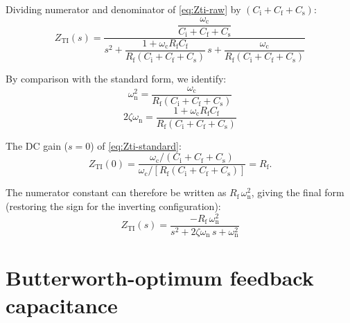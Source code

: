 \documentclass[a4paper,11pt]{article}
\begin{document}
Dividing numerator and denominator of \eqref{eq:Zti-raw} by
$(C_{\mathrm{i}} + C_{\mathrm{f}} + C_{\mathrm{s}})$:
\begin{equation}
  Z_{\mathrm{TI}}(s)
  = \frac{\dfrac{\omega_{\mathrm{c}}}
              {C_{\mathrm{i}} + C_{\mathrm{f}} + C_{\mathrm{s}}}}
         {s^2
          + \dfrac{1 + \omega_{\mathrm{c}}R_{\mathrm{f}}C_{\mathrm{f}}}
                  {R_{\mathrm{f}}
                   (C_{\mathrm{i}} + C_{\mathrm{f}} + C_{\mathrm{s}})}\,s
          + \dfrac{\omega_{\mathrm{c}}}
                  {R_{\mathrm{f}}
                   (C_{\mathrm{i}} + C_{\mathrm{f}} + C_{\mathrm{s}})}}
  \label{eq:Zti-standard}
\end{equation}

By comparison with the standard form, we identify:
\begin{equation}
  \omega_{\mathrm{n}}^2
  = \frac{\omega_{\mathrm{c}}}
         {R_{\mathrm{f}}(C_{\mathrm{i}} + C_{\mathrm{f}}
          + C_{\mathrm{s}})}
  \label{eq:omega-n}
\end{equation}
\begin{equation}
  2\zeta\omega_{\mathrm{n}}
  = \frac{1 + \omega_{\mathrm{c}} R_{\mathrm{f}} C_{\mathrm{f}}}
         {R_{\mathrm{f}}(C_{\mathrm{i}} + C_{\mathrm{f}}
          + C_{\mathrm{s}})}
  \label{eq:damping}
\end{equation}

The DC gain ($s = 0$) of \eqref{eq:Zti-standard}:
\begin{equation*}
  Z_{\mathrm{TI}}(0)
  = \frac{\omega_{\mathrm{c}}
          / (C_{\mathrm{i}} + C_{\mathrm{f}} + C_{\mathrm{s}})}
         {\omega_{\mathrm{c}}
          / [R_{\mathrm{f}}(C_{\mathrm{i}} + C_{\mathrm{f}}
          + C_{\mathrm{s}})]}
  = R_{\mathrm{f}}.
\end{equation*}

The numerator constant can therefore be written as
$R_{\mathrm{f}}\,\omega_{\mathrm{n}}^2$, giving the final form
(restoring the sign for the inverting configuration):
\begin{equation}
  Z_{\mathrm{TI}}(s)
  = \frac{-R_{\mathrm{f}}\,\omega_{\mathrm{n}}^2}
         {s^2 + 2\zeta\omega_{\mathrm{n}}\,s
          + \omega_{\mathrm{n}}^2}
  \label{eq:Zti-final}
\end{equation}

\section{Butterworth-optimum feedback capacitance}
\label{sec:butterworth}
\end{document}
